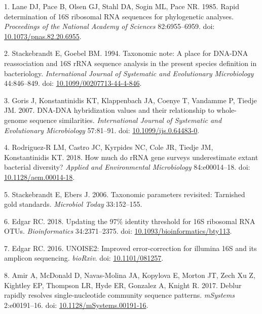 \documentclass[
]{article}
\newenvironment{cslreferences}%
  {}%
  {\par}
\begin{document}
\noindent

\hypertarget{refs}{}
\begin{cslreferences}
\leavevmode\hypertarget{ref-Lane1985}{}%
1. Lane DJ, Pace B, Olsen GJ, Stahl DA, Sogin ML, Pace NR. 1985. Rapid
determination of 16S ribosomal RNA sequences for phylogenetic analyses.
\emph{Proceedings of the National Academy of Sciences} 82:6955--6959.
doi:
\href{https://doi.org/10.1073/pnas.82.20.6955}{10.1073/pnas.82.20.6955}.

\leavevmode\hypertarget{ref-Stackebrandt1994}{}%
2. Stackebrandt E, Goebel BM. 1994. Taxonomic note: A place for DNA-DNA
reassociation and 16S rRNA sequence analysis in the present species
definition in bacteriology. \emph{International Journal of Systematic
and Evolutionary Microbiology} 44:846--849. doi:
\href{https://doi.org/10.1099/00207713-44-4-846}{10.1099/00207713-44-4-846}.

\leavevmode\hypertarget{ref-Goris2007}{}%
3. Goris J, Konstantinidis KT, Klappenbach JA, Coenye T, Vandamme P,
Tiedje JM. 2007. DNA-DNA hybridization values and their relationship to
whole-genome sequence similarities. \emph{International Journal of
Systematic and Evolutionary Microbiology} 57:81--91. doi:
\href{https://doi.org/10.1099/ijs.0.64483-0}{10.1099/ijs.0.64483-0}.

\leavevmode\hypertarget{ref-RodriguezR2018}{}%
4. Rodriguez-R LM, Castro JC, Kyrpides NC, Cole JR, Tiedje JM,
Konstantinidis KT. 2018. How much do rRNA gene surveys underestimate
extant bacterial diversity? \emph{Applied and Environmental
Microbiology} 84:e00014--18. doi:
\href{https://doi.org/10.1128/aem.00014-18}{10.1128/aem.00014-18}.

\leavevmode\hypertarget{ref-Stackebrandt2006}{}%
5. Stackebrandt E, Ebers J. 2006. Taxonomic parameters revisited:
Tarnished gold standards. \emph{Microbiol Today} 33:152--155.

\leavevmode\hypertarget{ref-Edgar2018}{}%
6. Edgar RC. 2018. Updating the 97\% identity threshold for 16S
ribosomal RNA OTUs. \emph{Bioinformatics} 34:2371--2375. doi:
\href{https://doi.org/10.1093/bioinformatics/bty113}{10.1093/bioinformatics/bty113}.

\leavevmode\hypertarget{ref-Edgar2016}{}%
7. Edgar RC. 2016. UNOISE2: Improved error-correction for illumina 16S
and its amplicon sequencing. \emph{bioRxiv}. doi:
\href{https://doi.org/10.1101/081257}{10.1101/081257}.

\leavevmode\hypertarget{ref-Amir2017}{}%
8. Amir A, McDonald D, Navas-Molina JA, Kopylova E, Morton JT, Zech Xu
Z, Kightley EP, Thompson LR, Hyde ER, Gonzalez A, Knight R. 2017. Deblur
rapidly resolves single-nucleotide community sequence patterns.
\emph{mSystems} 2:e00191--16. doi:
\href{https://doi.org/10.1128/mSystems.00191-16}{10.1128/mSystems.00191-16}.


\end{cslreferences}
\end{document}
